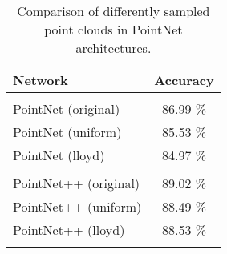 \begin{table}[]
	\centering
	\begin{tabular}{lc}
		\hline
		\textbf{Network}      & Accuracy \\ \hline
		                      &          \\
		PointNet (original)   & 86.99 \% \\
		PointNet (uniform)    & 85.53 \% \\
		PointNet (lloyd)      & 84.97 \% \\
		                      &          \\
		PointNet++ (original) & 89.02 \%  \\
		PointNet++ (uniform)  & 88.49 \%  \\
		PointNet++ (lloyd)    & 88.53 \% \\
		                      &          \\ \hline
	\end{tabular}
\caption{Comparison of differently sampled point clouds in PointNet architectures.}
\label{Table:pn}
\end{table}